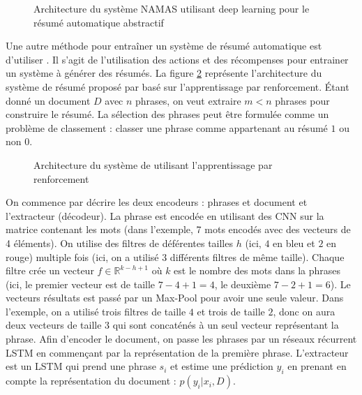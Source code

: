 \documentclass{KodeBook}
\begin{document}
\begin{figure}[!ht]
	\centering
	\caption{Architecture du système NAMAS utilisant deep learning pour le résumé automatique abstractif \cite{15-rush-al}}
	\label{fig:ats-namas} 
\end{figure}

Une autre méthode pour entraîner un système de résumé automatique est d'utiliser . 
Il s'agit de l'utilisation des actions et des récompenses pour entrainer un système à générer des résumés.
La figure \ref{fig:ats-narayan} représente l'architecture du système de résumé proposé par \citet{18-narayan-al} basé sur l'apprentissage par renforcement.
Étant donné un document $D$ avec $n$ phrases, on veut extraire $m < n$ phrases pour construire le résumé. 
La sélection des phrases peut être formulée comme un problème de classement : classer une phrase comme appartenant au résumé $1$ ou non $0$.

\begin{figure}[!ht]
	\centering
	\caption{Architecture du système de \citet{18-narayan-al} utilisant l'apprentissage par renforcement}
	\label{fig:ats-narayan}
\end{figure}

On commence par décrire les deux encodeurs : phrases et document et l'extracteur (décodeur).
La phrase est encodée en utilisant des CNN sur la matrice contenant les mots (dans l'exemple, 7 mots encodés avec des vecteurs de 4 éléments). 
On utilise des filtres de déférentes tailles $h$ (ici, $4$ en bleu et $2$ en rouge) multiple fois (ici, on a utilisé $3$ différents filtres de même taille). 
Chaque filtre crée un vecteur $f \in \mathbb{R}^{k-h+1}$ où $k$ est le nombre des mots dans la phrases (ici, le premier vecteur est de taille $7-4+1 = 4$, le deuxième $7-2+1 = 6$). 
Le vecteurs résultats est passé par un Max-Pool pour avoir une seule valeur. 
Dans l'exemple, on a utilisé trois filtres de taille $4$ et trois de taille $2$, donc on aura deux vecteurs de  taille $3$ qui sont concaténés à un seul vecteur représentant la phrase.
Afin d'encoder le document, on passe les phrases par un réseaux récurrent LSTM en commençant par la représentation de la première phrase.
L'extracteur est un LSTM qui prend une phrase $s_i$ et estime une prédiction $y_i$ en prenant en compte la représentation du document : $p(y_i|x_i, D)$.
\end{document}
